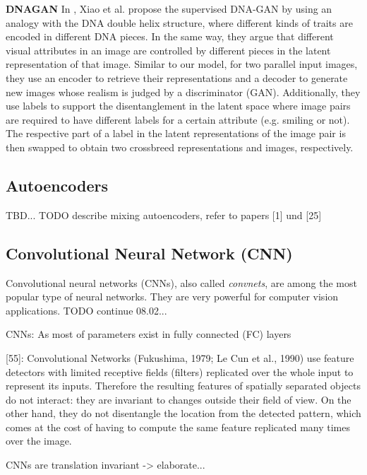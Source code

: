 \documentclass[12pt,a4paper]{article}
\begin{document}
\par \textbf{DNAGAN} In \cite{DnaGan}, Xiao et al. propose the supervised DNA-GAN by using an analogy with the DNA double helix structure, where different kinds of traits are encoded in different DNA pieces. In the same way, they argue that different visual attributes in an image are controlled by different pieces in the latent representation of that image. Similar to our model, for two parallel input images, they use an encoder to retrieve their representations and a decoder to generate new images whose realism is judged by a discriminator (GAN). Additionally, they use labels to support the disentanglement in the latent space where image pairs are required to have different labels for a certain attribute (e.g. smiling or not). The respective part of a label in the latent representations of the image pair is then swapped to obtain two crossbreed representations and images, respectively.


\subsection{Autoencoders}
TBD...
TODO describe mixing autoencoders, refer to papers [1] und [25]

\subsection{Convolutional Neural Network (CNN)}
Convolutional neural networks (CNNs), also called \textit{convnets}, are among the most popular type of neural networks. They are very powerful for computer vision applications. TODO continue 08.02...

\par CNNs: As most of parameters exist in fully connected (FC) layers

[55]: Convolutional Networks (Fukushima, 1979; Le Cun et al., 1990) use feature detectors with limited receptive fields (filters) replicated over the whole input to represent its inputs. Therefore the resulting features of spatially separated objects do not interact: they are invariant to changes outside their field of view. On the other hand, they do not disentangle the location from the detected pattern, which comes at the cost of having to compute the same feature replicated many times over the image.

\par CNNs are translation invariant -> elaborate...
\end{document}
